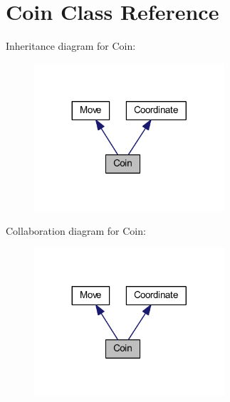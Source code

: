 \hypertarget{class_coin}{}\section{Coin Class Reference}
\label{class_coin}


Inheritance diagram for Coin\+:
\nopagebreak
\begin{figure}[H]
\begin{center}
\leavevmode
\includegraphics[width=200pt]{class_coin__inherit__graph}
\end{center}
\end{figure}


Collaboration diagram for Coin\+:
\nopagebreak
\begin{figure}[H]
\begin{center}
\leavevmode
\includegraphics[width=200pt]{class_coin__coll__graph}
\end{center}
\end{figure}
